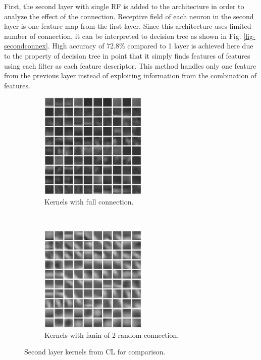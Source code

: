 \documentclass{article} %
\begin{document}
First, the second layer with single RF is added to the architecture in order to analyze the effect of the connection. Receptive field of each neuron in the second layer is one feature map from the first layer. Since this architecture uses limited number of connection, it can be interpreted to decision tree as shown in Fig. \ref{fig-secondconnex}. High accuracy of 72.8\% compared to 1 layer is achieved here due to the property of decision tree in point that it simply finds features of features using each filter as each feature descriptor. This method handles only one feature from the previous layer instead of exploiting information from the combination of features.

\begin{figure}
        \centering
        \label{fig-secondkernels}
        \begin{subfigure}[b]{0.5\textwidth}
                \centering
                \includegraphics[width=2.0in]{fig-kernels2-full.eps}
                \caption{Kernels with full connection.}
        \end{subfigure}%
        ~%
        \begin{subfigure}[b]{0.5\textwidth}
                \centering
                \includegraphics[width=2.0in]{fig-kernels2-random.eps}
                \caption{Kernels with fanin of 2 random connection.}
        \end{subfigure}
        \caption{Second layer kernels from CL for comparison.}
\end{figure}
\end{document}
